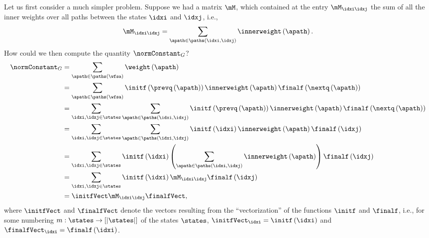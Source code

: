 Let us first consider a much simpler problem.
Suppose we had a matrix $\mM$, which contained at the entry $\mM_{\idxi \idxj}$ the sum of all the inner weights over all paths between the states $\idxi$ and $\idxj$, i.e., 
\begin{equation*}
    \mM_{\idxi \idxj} = \sum_{\apath \in \paths\left( \idxi, \idxj \right) }  \innerweight \left( \apath \right).
\end{equation*}
How could we then compute the quantity $\normConstant_G$?
\begin{align}
    \normConstant_G &= \sum_{\apath \in \paths\left( \wfsa \right) }  \weight \left( \apath \right) \\
    &= \sum_{\apath \in \paths\left( \wfsa \right) }  \initf \left( \prevq \left( \apath \right) \right) \innerweight \left( \apath \right) \finalf \left( \nextq \left( \apath \right) \right) \\
    &= \sum_{\idxi, \idxj \in \states}\sum_{\apath \in \paths\left( \idxi, \idxj \right) }  \initf \left( \prevq \left( \apath \right) \right) \innerweight \left( \apath \right) \finalf \left( \nextq \left( \apath \right) \right) \\
    &= \sum_{\idxi, \idxj \in \states}\sum_{\apath \in \paths\left( \idxi, \idxj \right) }  \initf \left( \idxi \right) \innerweight \left( \apath \right) \finalf \left( \idxj \right) \\
    &= \sum_{\idxi, \idxj \in \states} \initf \left( \idxi \right) \left(\sum_{\apath \in \paths\left( \idxi, \idxj \right) }  \innerweight \left( \apath \right) \right) \finalf \left( \idxj \right) \\
    &= \sum_{\idxi, \idxj \in \states} \initf \left( \idxi \right) \mM_{\idxi \idxj} \finalf \left( \idxj \right) \\
    &= \initfVect \mM_{\idxi \idxj} \finalfVect,
\end{align}
where $\initfVect$ and $\finalfVect$ denote the vectors resulting from the ``vectorization'' of the functions $\initf$ and $\finalf$, i.e., for some numbering $m: \states \to \left[|\states|\right]$ of the states $\states$, $\initfVect_\idxi = \initf\left(\idxi\right)$ and $\finalfVect_\idxi = \finalf\left(\idxi\right)$.

